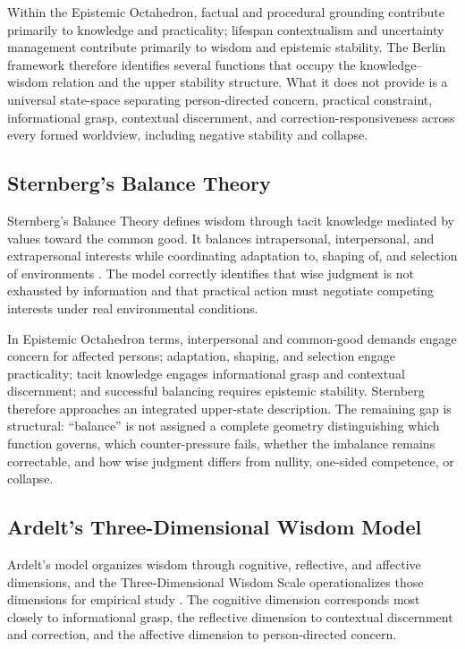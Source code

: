 \documentclass[11pt]{article}
\begin{document}
Within the Epistemic Octahedron, factual and procedural grounding contribute primarily to knowledge and practicality; lifespan contextualism and uncertainty management contribute primarily to wisdom and epistemic stability. The Berlin framework therefore identifies several functions that occupy the knowledge--wisdom relation and the upper stability structure. What it does not provide is a universal state-space separating person-directed concern, practical constraint, informational grasp, contextual discernment, and correction-responsiveness across every formed worldview, including negative stability and collapse.

\subsection{Sternberg's Balance Theory}

Sternberg's Balance Theory defines wisdom through tacit knowledge mediated by values toward the common good. It balances intrapersonal, interpersonal, and extrapersonal interests while coordinating adaptation to, shaping of, and selection of environments \cite{sternberg1998}. The model correctly identifies that wise judgment is not exhausted by information and that practical action must negotiate competing interests under real environmental conditions.

In Epistemic Octahedron terms, interpersonal and common-good demands engage concern for affected persons; adaptation, shaping, and selection engage practicality; tacit knowledge engages informational grasp and contextual discernment; and successful balancing requires epistemic stability. Sternberg therefore approaches an integrated upper-state description. The remaining gap is structural: ``balance'' is not assigned a complete geometry distinguishing which function governs, which counter-pressure fails, whether the imbalance remains correctable, and how wise judgment differs from nullity, one-sided competence, or collapse.

\subsection{Ardelt's Three-Dimensional Wisdom Model}

Ardelt's model organizes wisdom through cognitive, reflective, and affective dimensions, and the Three-Dimensional Wisdom Scale operationalizes those dimensions for empirical study \cite{ardelt2003}. The cognitive dimension corresponds most closely to informational grasp, the reflective dimension to contextual discernment and correction, and the affective dimension to person-directed concern.
\end{document}
